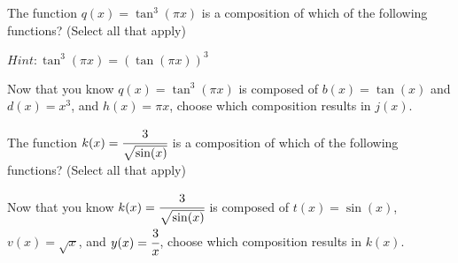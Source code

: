 \documentclass{ximera}
\begin{document}
\begin{problem}

    The function $q(x) = \tan^3(\pi x)$ is a composition of which of the following functions?  (Select all that apply)
    
    \begin{hint}
    
    $Hint: \tan^3(\pi x) = \left(\tan(\pi x)\right)^3$
    
    \end{hint}
    
        \begin{selectAll}
        \end{selectAll}
        
    \begin{problem}
        Now that you know $q(x) = \tan^3(\pi x)$ is composed of $b(x) = \tan(x)$ and $d(x) = x^3$, and $h(x) = \pi x$, choose which composition results in $j(x)$. 
        
            \begin{multipleChoice}
            \end{multipleChoice}
    \end{problem}
\end{problem}
    
\begin{problem}

    The function $k(x) = \cfrac{3}{\sqrt{\sin(x)}}$ is a composition of which of the following functions?  (Select all that apply)
    
        \begin{selectAll}
        \end{selectAll}
        
    \begin{problem}
        Now that you know $k(x) = \cfrac{3}{\sqrt{\sin(x)}}$ is composed of $t(x) = \sin(x)$, $v(x) = \sqrt{x}$, and $y(x) = \cfrac{3}{x}$, choose which composition results in $k(x)$. 
        
            \begin{multipleChoice}
            \end{multipleChoice}
    \end{problem}

\end{problem}
\end{document}
